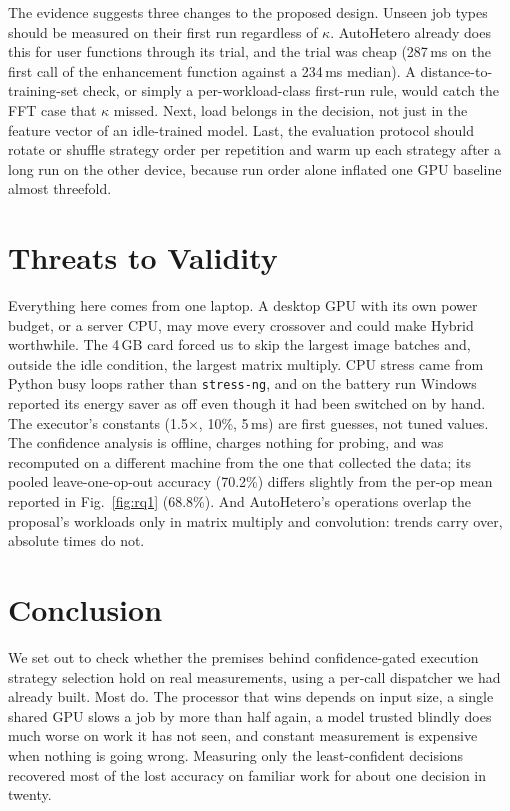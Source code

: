 \documentclass[conference]{IEEEtran}
\begin{document}
The evidence suggests three changes to the proposed design. Unseen job types should be measured on their first run regardless of $\kappa$. AutoHetero already does this for user functions through its trial, and the trial was cheap (287\,ms on the first call of the enhancement function against a 234\,ms median). A distance-to-training-set check, or simply a per-workload-class first-run rule, would catch the FFT case that $\kappa$ missed. Next, load belongs in the decision, not just in the feature vector of an idle-trained model. Last, the evaluation protocol should rotate or shuffle strategy order per repetition and warm up each strategy after a long run on the other device, because run order alone inflated one GPU baseline almost threefold.

\section{Threats to Validity}

Everything here comes from one laptop. A desktop GPU with its own power budget, or a server CPU, may move every crossover and could make Hybrid worthwhile. The 4\,GB card forced us to skip the largest image batches and, outside the idle condition, the largest matrix multiply. CPU stress came from Python busy loops rather than \texttt{stress-ng}, and on the battery run Windows reported its energy saver as off even though it had been switched on by hand. The executor's constants (1.5$\times$, 10\%, 5\,ms) are first guesses, not tuned values. The confidence analysis is offline, charges nothing for probing, and was recomputed on a different machine from the one that collected the data; its pooled leave-one-op-out accuracy (70.2\%) differs slightly from the per-op mean reported in Fig.~\ref{fig:rq1} (68.8\%). And AutoHetero's operations overlap the proposal's workloads only in matrix multiply and convolution: trends carry over, absolute times do not.

\section{Conclusion}

We set out to check whether the premises behind confidence-gated execution strategy selection hold on real measurements, using a per-call dispatcher we had already built. Most do. The processor that wins depends on input size, a single shared GPU slows a job by more than half again, a model trusted blindly does much worse on work it has not seen, and constant measurement is expensive when nothing is going wrong. Measuring only the least-confident decisions recovered most of the lost accuracy on familiar work for about one decision in twenty.
\end{document}
